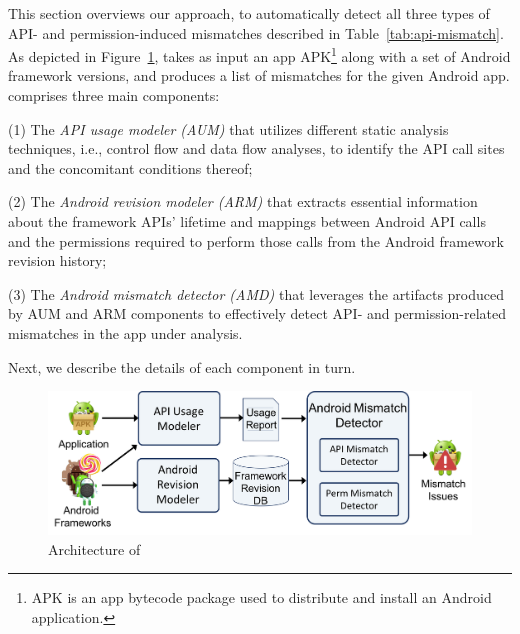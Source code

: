 
This section overviews our approach, 
to automatically detect all three types
of API- and permission-induced mismatches described in
Table~\ref{tab:api-mismatch}. As depicted in
Figure~\ref{fig:arch}, \@approach takes as input an app
APK\footnote{APK is an app bytecode package used to
distribute and install an Android application.} along
with a set of Android framework versions, and produces
a list of mismatches for the given Android app.  
\@approach comprises three main components:


(1) The \textit{API usage modeler (AUM)} that utilizes
different static analysis techniques, i.e., control
flow and data flow analyses, to  identify the API call
sites and the concomitant conditions thereof; 

(2) The \textit{Android revision modeler (ARM)} that
extracts essential information about the framework
APIs' lifetime and mappings between Android API calls
and the permissions required to perform those calls
from the Android framework revision history;

(3) The \textit{Android mismatch detector (AMD)} that
leverages the artifacts produced by AUM and ARM
components to effectively detect API- and
permission-related mismatches in the app under
analysis.

Next, we describe the details of each component in
turn.
 

\begin{figure}[t!]
    \centering
    \includegraphics[width=\linewidth]{images/Approach.png}
    \vspace{-0.2cm}    
    \caption{Architecture of \@approach}
    \label{fig:arch}
    \vspace{-0.6cm}
\end{figure}

